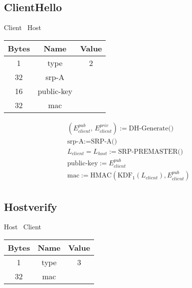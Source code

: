 \subsection{ClientHello}

\begin{center}
    Client \textrightarrow\ Host\\
    \begin{tabular}{|c|c|c|}
        \hline
        \textbf{Bytes} & \textbf{Name} & \textbf{Value} \\
        \hline
        1              & type          & 2              \\
        \hline
        32            & srp-A         &                \\
        \hline
        16             & public-key    &                \\
        \hline
        32             & mac           &                \\
        \hline
    \end{tabular}
\end{center}

\begin{align*}
    & (E_{client}^{pub},\, E_{client}^{priv}) := \text{DH-Generate()}\\
    & \text{srp-A} := \text{SRP-A()}\\
    & L_{client} = L_{host} := \text{SRP-PREMASTER()}\\
    & \text{public-key} := E_{client}^{pub}\\
    & \text{mac} := \text{HMAC}(\text{KDF}_1(L_{client}), E_{client}^{pub})\\
\end{align*}

\subsection{Hostverify}

\begin{center}
    Host \textrightarrow\ Client\\
    \begin{tabular}{|c|c|c|}
        \hline
        \textbf{Bytes} & \textbf{Name} & \textbf{Value} \\
        \hline
        1              & type          & 3              \\
        \hline
        32             & mac           &                \\
        \hline
    \end{tabular}
\end{center}

